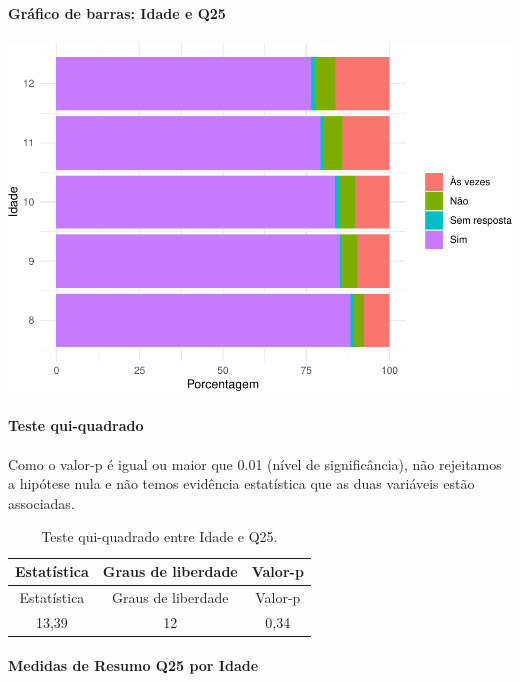 \documentclass[]{article}
\let\oldparagraph\paragraph
\renewcommand{\paragraph}[1]{\oldparagraph{#1}\mbox{}}
\begin{document}
\hypertarget{gruxe1fico-de-barras-idade-e-q25}{%
\paragraph{Gráfico de barras: Idade e Q25}\label{gruxe1fico-de-barras-idade-e-q25}}

\begin{center}\includegraphics[width=0.75\linewidth]{relatorio_covid19_files/figure-latex/unnamed-chunk-682-1} \end{center}

\hypertarget{teste-qui-quadrado-59}{%
\paragraph{Teste qui-quadrado}\label{teste-qui-quadrado-59}}

Como o valor-p é igual ou maior que 0.01 (nível de significância), não rejeitamos a hipótese nula e não temos evidência estatística que as duas variáveis estão associadas.

\begin{longtable}[]{@{}ccc@{}}
\caption{\label{tab:unnamed-chunk-684}Teste qui-quadrado entre Idade e Q25.}\tabularnewline
\toprule
Estatística & Graus de liberdade & Valor-p\tabularnewline
\midrule
\endfirsthead
\toprule
Estatística & Graus de liberdade & Valor-p\tabularnewline
\midrule
\endhead
13,39 & 12 & 0,34\tabularnewline
\bottomrule
\end{longtable}

\cleardoublepage

\hypertarget{medidas-de-resumo-q25-por-idade}{%
\paragraph{Medidas de Resumo Q25 por Idade}\label{medidas-de-resumo-q25-por-idade}}
\end{document}
